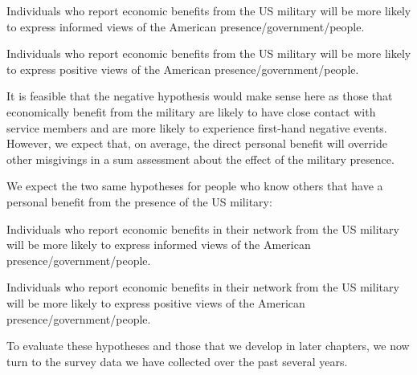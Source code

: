 \begin{subhyp}
	
	\begin{hyp}
		Individuals who report economic benefits from the US military will be more likely to express informed views of the American presence/government/people. 
	\end{hyp}
	
	
	\begin{hyp}
		Individuals who report economic benefits from the US military will be more likely to express positive views of the American presence/government/people. 
	\end{hyp}
	
	
\end{subhyp}


It is feasible that the negative hypothesis would make sense here as those that economically  benefit from the military are likely to have close contact with service members and are more likely to experience first-hand negative events. However, we expect that, on average, the direct personal benefit will override other misgivings in a sum assessment about the effect of the military presence.

We expect the two same hypotheses for people who know others that have a personal benefit from the presence of the US military:

\begin{subhyp}
	
	\begin{hyp}
		Individuals who report economic benefits in their network from the US military will be more likely to express informed views of the American presence/government/people. 
	\end{hyp}
	
	
	\begin{hyp}
		Individuals who report economic benefits in their network from the US military will be more likely to express positive views of the American presence/government/people. 
	\end{hyp}
	
	
\end{subhyp}

To evaluate these hypotheses and those that we develop in later chapters, we now turn to the survey data we have collected over the past several years. 


